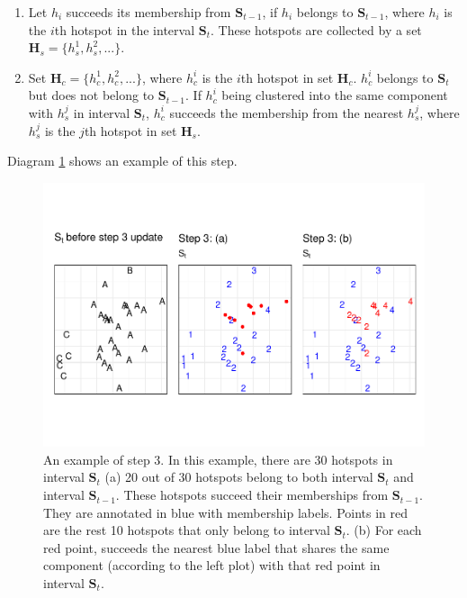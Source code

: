 \begin{enumerate}
\def\labelenumi{(\alph{enumi})}
\item
  Let \(h_i\) succeeds its membership from \(\boldsymbol{S}_{t-1}\), if
  \(h_i\) belongs to \(\boldsymbol{S}_{t-1}\), where \(h_i\) is the
  \(i\)th hotspot in the interval \(\boldsymbol{S}_t\). These hotspots
  are collected by a set \(\boldsymbol{H}_s = \{h_s^1,h_s^2,...\}\).
\item
  Set \(\boldsymbol{H}_c = \{h_c^1,h_c^2,...\}\), where \(h_c^i\) is the
  \(i\)th hotspot in set \(\boldsymbol{H}_c\). \(h_c^i\) belongs to
  \(\boldsymbol{S}_t\) but does not belong to \(\boldsymbol{S}_{t-1}\).
  If \(h_c^i\) being clustered into the same component with \(h_s^j\) in
  interval \(\boldsymbol{S}_t\), \(h_c^i\) succeeds the membership from
  the nearest \(h_s^j\), where \(h_s^j\) is the \(j\)th hotspot in set
  \(\boldsymbol{H}_s\).
\end{enumerate}

Diagram \ref{fig:step3figs} shows an example of this step.

\begin{Schunk}
\begin{figure}

{\centering \includegraphics[width=0.8\linewidth]{clustering_paper_files/figure-latex/step3figs-1} 

}

\caption{An example of step 3. In this example, there are 30 hotspots in interval $\boldsymbol{S}_t$ (a) 20 out of 30 hotspots belong to both interval $\boldsymbol{S}_t$ and interval $\boldsymbol{S}_{t-1}$. These hotspots succeed their memberships from $\boldsymbol{S}_{t-1}$. They are annotated in blue with membership labels. Points in red are the rest 10 hotspots that only belong to interval $\boldsymbol{S}_t$. (b) For each red point, succeeds the nearest blue label that shares the same component (according to the left plot) with that red point in interval $\boldsymbol{S}_t$. }\label{fig:step3figs}
\end{figure}
\end{Schunk}

